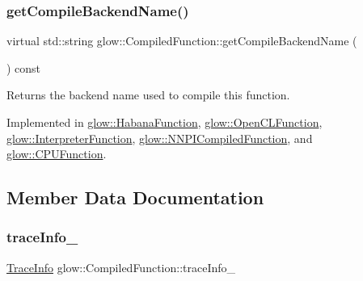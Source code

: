 \mbox{\label{classglow_1_1_compiled_function_a7b3f2b17986d14706a1d1091d3c4df27}} 
\subsubsection{\texorpdfstring{get\+Compile\+Backend\+Name()}{getCompileBackendName()}}
{\footnotesize\ttfamily virtual std\+::string glow\+::\+Compiled\+Function\+::get\+Compile\+Backend\+Name (\begin{DoxyParamCaption}{ }\end{DoxyParamCaption}) const\hspace{0.3cm}{\ttfamily [pure virtual]}}

\begin{DoxyReturn}{Returns}
the backend name used to compile this function. 
\end{DoxyReturn}


Implemented in \hyperlink{classglow_1_1_habana_function_a6bafdb9b97ae532ecc58edbba6e74daf}{glow\+::\+Habana\+Function}, \hyperlink{classglow_1_1_open_c_l_function_ad676ba76a33a2e8802caa82052b569c9}{glow\+::\+Open\+C\+L\+Function}, \hyperlink{classglow_1_1_interpreter_function_a7fe37f3e6fe47a7806ecc1cb6d05b2c2}{glow\+::\+Interpreter\+Function}, \hyperlink{classglow_1_1_n_n_p_i_compiled_function_a389e936aa03cbbed8241a5d2b6477923}{glow\+::\+N\+N\+P\+I\+Compiled\+Function}, and \hyperlink{classglow_1_1_c_p_u_function_a4bf0faf1e98bcf21ec058c031df3c036}{glow\+::\+C\+P\+U\+Function}.



\subsection{Member Data Documentation}
\mbox{\label{classglow_1_1_compiled_function_a278d778b419f4cc47de002c9eae62857}} 
\subsubsection{\texorpdfstring{trace\+Info\+\_\+}{traceInfo\_}}
{\footnotesize\ttfamily \hyperlink{structglow_1_1_trace_info}{Trace\+Info} glow\+::\+Compiled\+Function\+::trace\+Info\+\_\+\hspace{0.3cm}{\ttfamily [protected]}}

